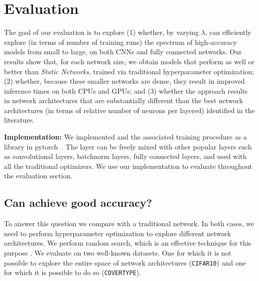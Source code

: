 \section{Evaluation}

The goal of our evaluation is to explore (1) whether, by varying $\lambda$, \shrink can efficiently
explore (in terms of number of training runs)  the spectrum of high-accuracy
models from small to large, on both CNNs and fully connected networks.  Our
results show that, for each network size, we obtain models that perform as well
or better than \textit{Static Networks}, trained via traditional hyperparameter
optimization;  (2) whether, because these  smaller networks are dense, they result in
improved inference times on both CPUs and GPUs; and (3) whether the \shrink approach results in network architectures that are
substantially different than the best network architectures (in terms of
relative number of neurons per layered) identified in the literature.

\noindent\textbf{Implementation: }We implemented \swls and
the associated training procedure as a library in
pytorch~\cite{paszke2017automatic}. The layer can be freely mixed with other
popular layers such as convolutional layers, batchnorm layers, fully connected
layers, and used with all the traditional optimizers. We use our implementation
to evaluate \shrink throughout the evaluation section.

\subsection{Can \shrink achieve good accuracy?}

To answer this question we compare \shrink with a traditional network. In
both cases, we need to perform hyperparameter optimization to explore different
network architectures. We perform random search, which is an effective technique
for this purpose \cite{BergstraJAMESBERGSTRA2012}. We evaluate \shrink on two well-known datasets. One
for which it is not possible to explore the entire space of network
architectures (\texttt{CIFAR10}) and one for which it is possible to do so
(\texttt{COVERTYPE}).

